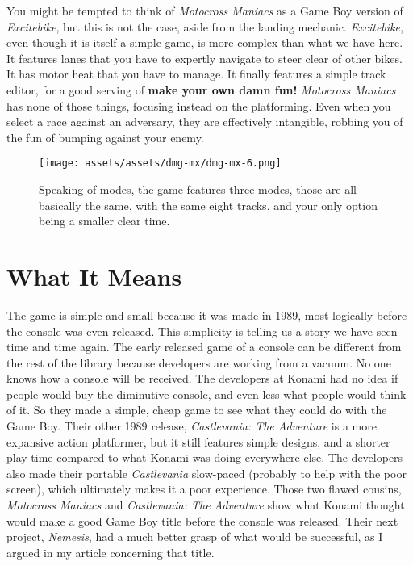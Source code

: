 \documentclass{book}
\begin{document}
You might be tempted to think of \emph{Motocross Maniacs} as a Game Boy version of \emph{Excitebike}, but this is not the case, aside from the landing mechanic. \emph{Excitebike}, even though it is itself a simple game, is more complex than what we have here. It features lanes that you have to expertly navigate to steer clear of other bikes. It has motor heat that you have to manage. It finally features a simple track editor, for a good serving of \textbf{make your own damn fun!} \emph{Motocross Maniacs} has none of those things, focusing instead on the platforming. Even when you select a race against an adversary, they are effectively intangible, robbing you of the fun of bumping against your enemy.

\begin{figure}[hbt]
\vskip 10pt
\centering \texttt{[image: assets/assets/dmg-mx/dmg-mx-6.png]}\par\pagetwodescription Speaking of modes, the game features three modes, those are all basically the same, with the same eight tracks, and your only option being a smaller clear time.
\vskip 6pt
\end{figure}

\FloatBarrier\needspace{10mm}\section*{What It Means}\nopagebreak[4]

The game is simple and small because it was made in 1989, most logically before the console was even released. This simplicity is telling us a story we have seen time and time again. The early released game of a console can be different from the rest of the library because developers are working from a vacuum. No one knows how a console will be received. The developers at Konami had no idea if people would buy the diminutive console, and even less what people would think of it. So they made a simple, cheap game to see what they could do with the Game Boy. Their other 1989 release, \emph{Castlevania: The Adventure} is a more expansive action platformer, but it still features simple designs, and a shorter play time compared to what Konami was doing everywhere else. The developers also made their portable \emph{Castlevania} slow-paced (probably to help with the poor screen), which ultimately makes it a poor experience. Those two flawed cousins, \emph{Motocross Maniacs} and \emph{Castlevania: The Adventure} show what Konami thought would make a good Game Boy title before the console was released. Their next project, \emph{Nemesis}, had a much better grasp of what would be successful, as I argued in my article concerning that title.
\end{document}
